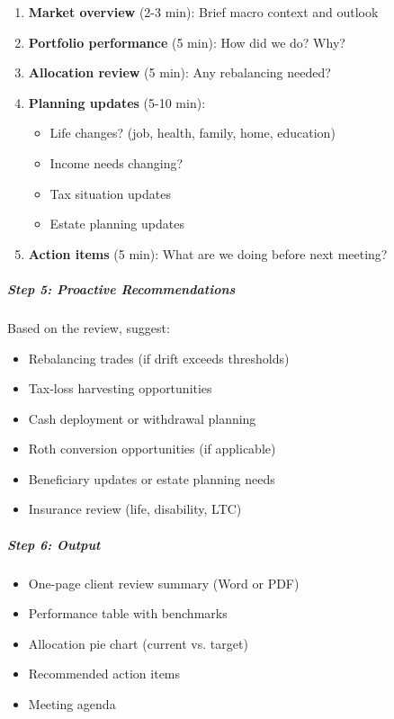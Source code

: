 \documentclass[11pt]{article}
\begin{document}
\begin{enumerate}[leftmargin=*,itemsep=2pt,topsep=2pt]
\item {} \textbf{Market overview} (2-3 min): Brief macro context and outlook
\item {} \textbf{Portfolio performance} (5 min): How did we do? Why?
\item {} \textbf{Allocation review} (5 min): Any rebalancing needed?
\item {} \textbf{Planning updates} (5-10 min):
\begin{itemize}[leftmargin=*,itemsep=2pt,topsep=2pt]
\item {} Life changes? (job, health, family, home, education)
\item {} Income needs changing?
\item {} Tax situation updates
\item {} Estate planning updates
\end{itemize}
\item {} \textbf{Action items} (5 min): What are we doing before next meeting?
\end{enumerate}

\subparagraph{Step 5: Proactive Recommendations}\mbox{}\par

Based on the review, suggest:

\begin{itemize}[leftmargin=*,itemsep=2pt,topsep=2pt]
\item {} Rebalancing trades (if drift exceeds thresholds)
\item {} Tax-loss harvesting opportunities
\item {} Cash deployment or withdrawal planning
\item {} Roth conversion opportunities (if applicable)
\item {} Beneficiary updates or estate planning needs
\item {} Insurance review (life, disability, LTC)
\end{itemize}

\subparagraph{Step 6: Output}\mbox{}\par

\begin{itemize}[leftmargin=*,itemsep=2pt,topsep=2pt]
\item {} One-page client review summary (Word or PDF)
\item {} Performance table with benchmarks
\item {} Allocation pie chart (current vs. target)
\item {} Recommended action items
\item {} Meeting agenda
\end{itemize}
\end{document}

